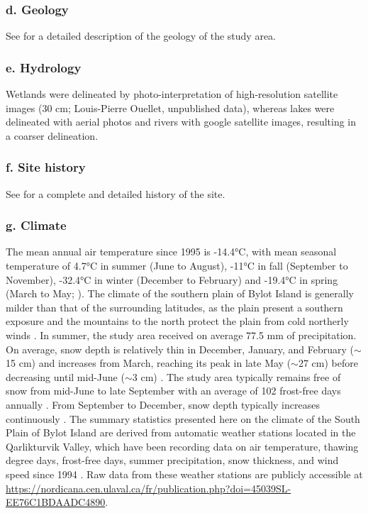 \documentclass[a4paper,twoside,12pt]{article}
\begin{document}
                \subsubsection*{d. Geology} See \citet{klassen1993} for a detailed description of the geology of the study area.
                \subsubsection*{e. Hydrology} Wetlands were delineated by photo-interpretation of high-resolution satellite images (30 cm; Louis-Pierre Ouellet, unpublished data), whereas lakes were delineated with aerial photos and rivers with google satellite images, resulting in a coarser delineation.
                \subsubsection*{f. Site history} See \citet{gauthier2024a, gauthier2024b}  for a complete and detailed history of the site.
                \subsubsection*{g. Climate} The mean annual air temperature since 1995 is -14.4°C, with mean seasonal temperature of 4.7°C in summer (June to August), -11°C in fall (September to November), -32.4°C in winter (December to February) and -19.4°C in spring (March to May; \citet{bylotclimate}). The climate of the southern plain of Bylot Island is generally milder than that of the surrounding latitudes, as the plain present a southern exposure and the mountains to the north protect the plain from cold northerly winds \citep{gauthier2024a}. In summer, the study area received on average 77.5 mm of precipitation. On average, snow depth is relatively thin in December, January, and February ($\sim$15 cm) and increases from March, reaching its peak in late May ($\sim$27 cm) before decreasing until mid-June ($\sim$3 cm) \citep{bylotclimate}. The study area typically remains free of snow from mid-June to late September \citep{gauthier2013} with an average of 102 frost-free days annually \citep{bylotclimate}. From September to December, snow depth typically increases continuously \citep{bylotclimate}. The summary statistics presented here on the climate of the South Plain of Bylot Island are derived from automatic weather stations located in the Qarlikturvik Valley, which have been recording data on air temperature, thawing degree days, frost-free days, summer precipitation, snow thickness, and wind speed since 1994 \citep{bylotclimate}. Raw data from these weather stations are publicly accessible at \url{https://nordicana.cen.ulaval.ca/fr/publication.php?doi=45039SL-EE76C1BDAADC4890}.
\newpage
       
\end{document}

